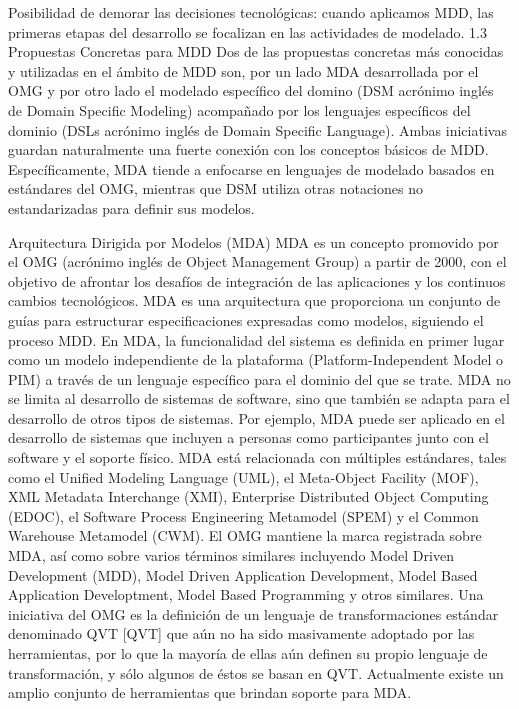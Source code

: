 \begin{enumerate}
Posibilidad de demorar las decisiones tecnológicas: cuando aplicamos MDD, las primeras etapas del desarrollo se focalizan en las actividades de modelado.
1.3	Propuestas Concretas para MDD
Dos de las propuestas concretas más conocidas y utilizadas en el ámbito de MDD son, por un lado MDA desarrollada por el OMG y por otro lado el modelado específico del domino (DSM acrónimo inglés de Domain Specific Modeling) acompañado por los lenguajes específicos del dominio (DSLs acrónimo inglés de Domain Specific Language). Ambas iniciativas guardan naturalmente una fuerte conexión con los conceptos básicos de MDD. Específicamente, MDA tiende a enfocarse en lenguajes de modelado basados en estándares del OMG, mientras que DSM utiliza otras notaciones no estandarizadas para definir sus modelos.

Arquitectura Dirigida por Modelos (MDA)
MDA es un concepto promovido por el OMG (acrónimo inglés de Object Management Group) a partir de 2000, con el objetivo de afrontar los desafíos de integración de las aplicaciones y los continuos cambios tecnológicos. MDA es una arquitectura que proporciona un conjunto de guías para estructurar especificaciones expresadas como modelos, siguiendo el proceso MDD.
En MDA, la funcionalidad del sistema es definida en primer lugar como un modelo independiente de la plataforma (Platform-Independent Model o PIM) a través de un lenguaje específico para el dominio del que se trate.
MDA no se limita al desarrollo de sistemas de software, sino que también se adapta para el desarrollo de otros tipos de sistemas. Por ejemplo, MDA puede ser aplicado en el desarrollo de sistemas que incluyen a personas como participantes junto con el software y el soporte físico.
MDA está relacionada con múltiples estándares, tales como el Unified Modeling Language (UML), el Meta-Object Facility (MOF), XML Metadata Interchange (XMI), Enterprise Distributed Object Computing (EDOC), el Software Process Engineering Metamodel (SPEM) y el Common Warehouse Metamodel (CWM).
El OMG mantiene la marca registrada sobre MDA, así como sobre varios términos similares incluyendo Model Driven Development (MDD), Model Driven Application Development, Model Based Application Developtment, Model Based Programming y otros similares.
Una iniciativa del OMG es la definición de un lenguaje de transformaciones estándar denominado QVT [QVT] que aún no ha sido masivamente adoptado por las herramientas, por lo que la mayoría de ellas aún definen su propio lenguaje de transformación, y sólo algunos de éstos se basan en QVT. Actualmente existe un amplio conjunto de herramientas que brindan soporte para MDA.

\end{enumerate}
